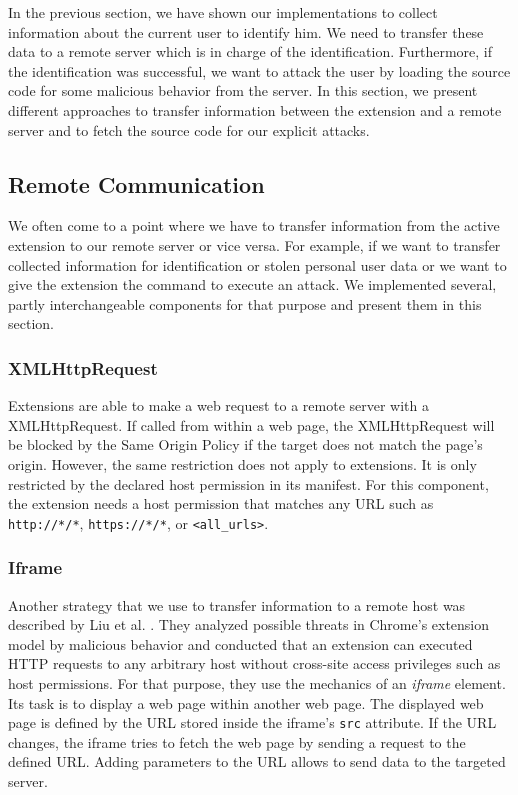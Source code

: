 	In the previous section, we have shown our implementations to collect information about the current user to identify him. We need to transfer these data to a remote server which is in charge of the identification. Furthermore, if the identification was successful, we want to attack the user by loading the source code for some malicious behavior from the server. In this section, we present different approaches to transfer information between the extension and a remote server and to fetch the source code for our explicit attacks.
	
\subsection{Remote Communication}
\label{sec:remoteCommunication}

	We often come to a point where we have to transfer information from the active extension to our remote server or vice versa. For example, if we want to transfer collected information for identification or stolen personal user data or we want to give the extension the command to execute an attack. We implemented several, partly interchangeable components for that purpose and present them in this section.

\subsubsection{XMLHttpRequest}
\label{sec:xhrCommunication}

	Extensions are able to make a web request to a remote server with a XMLHttpRequest. If called from within a web page, the XMLHttpRequest will be blocked by the Same Origin Policy if the target does not match the page's origin. However, the same restriction does not apply to extensions. It is only restricted by the declared host permission in its manifest. For this component, the extension needs a host permission that matches any URL such as \texttt{http://*/*}, \texttt{https://*/*}, or \texttt{<all\_urls>}. 

\subsubsection{Iframe}
\label{sec:iframeCommunication}

	Another strategy that we use to transfer information to a remote host was described by Liu et al. \cite{Liu12chromeextensions:}. They analyzed possible threats in Chrome's extension model by malicious behavior and conducted that an extension can executed HTTP requests to any arbitrary host without cross-site access privileges such as host permissions. For that purpose, they use the mechanics of an \textit{iframe} element. Its task is to display a web page within another web page. The displayed web page is defined by the URL stored inside the iframe's \texttt{src} attribute. If the URL changes, the iframe tries to fetch the web page by sending a request to the defined URL. Adding parameters to the URL allows to send data to the targeted server. 

